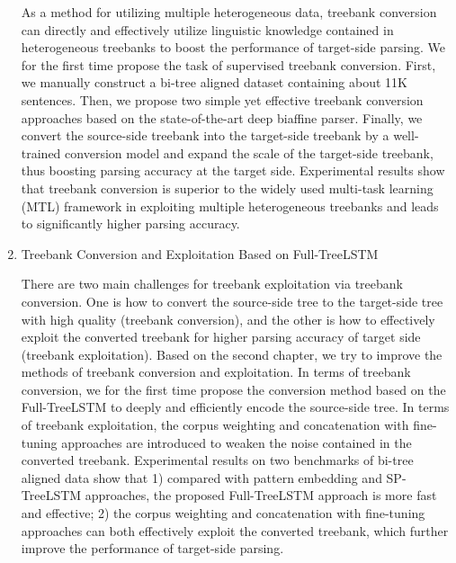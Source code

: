 \begin{eabstract}
\begin{enumerate}
		      As a method for utilizing multiple heterogeneous data, treebank conversion can directly and effectively utilize linguistic knowledge contained in heterogeneous treebanks to boost the performance of target-side parsing.
		      We for the first time propose the task of supervised treebank conversion. First, we manually construct a bi-tree aligned dataset containing about 11K sentences. Then, we propose two simple yet effective treebank conversion approaches based on the state-of-the-art deep biaffine parser. Finally, we convert the source-side treebank into the target-side treebank by a well-trained conversion model and expand the scale of the target-side treebank, thus boosting parsing accuracy at the target side. Experimental results show that treebank conversion is superior to the widely used multi-task learning (MTL) framework in exploiting multiple heterogeneous treebanks and leads to significantly higher parsing accuracy.

		\item Treebank Conversion and Exploitation Based on Full-TreeLSTM

		      There are two main challenges for treebank exploitation via treebank conversion. One is how to convert  the source-side tree to the target-side tree with high quality (treebank conversion), and the other is how to eﬀectively exploit the converted treebank for higher parsing accuracy of target side (treebank exploitation).
		      Based on the second chapter, we try to improve the methods of treebank conversion and  exploitation.
		      In terms of treebank conversion, we for the first time propose the conversion method based on the Full-TreeLSTM to deeply and efficiently encode the source-side tree.
		      In terms of treebank exploitation, the corpus weighting and concatenation with fine-tuning approaches are introduced to weaken the noise contained in the converted treebank. Experimental results on two benchmarks of bi-tree aligned data show that 1) compared with pattern embedding and SP-TreeLSTM approaches, the proposed Full-TreeLSTM approach is more fast and effective; 2) the corpus weighting and concatenation with fine-tuning approaches can both effectively exploit the converted treebank, which further improve the performance of target-side parsing.



\end{enumerate}
\end{eabstract}
